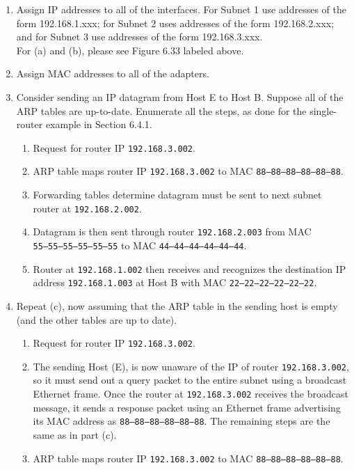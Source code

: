 \documentclass[12pt]{article}
\begin{document}
\begin{enumerate}
    \begin{enumerate}
        \item Assign IP addresses to all of the interfaces. For Subnet 1 use addresses of the form 192.168.1.xxx; for Subnet 2 uses addresses of the form 192.168.2.xxx; and for Subnet 3 use addresses of the form 192.168.3.xxx.\\[1em]
        For (a) and (b), please see Figure 6.33 labeled above.
        \item Assign MAC addresses to all of the adapters.
        \item Consider sending an IP datagram from Host E to Host B. Suppose all of the ARP tables are up-to-date. Enumerate all the steps, as done for the single-router example in Section 6.4.1.
        \begin{enumerate}
            \item Request for router IP \texttt{192.168.3.002}.
            \item ARP table maps router IP \texttt{192.168.3.002} to MAC \texttt{88--88--88--88--88--88}.
            \item Forwarding tables determine datagram must be sent to next subnet router at \texttt{192.168.2.002}.
            \item Datagram is then sent through router \texttt{192.168.2.003} from MAC\\ \texttt{55--55--55--55--55--55} to MAC \texttt{44--44--44--44--44--44}.
            \item Router at \texttt{192.168.1.002} then receives and recognizes the destination IP address \texttt{192.168.1.003} at Host B with MAC \texttt{22--22--22--22--22--22}.
        \end{enumerate}
        \item Repeat (c), now assuming that the ARP table in the sending host is empty (and the other tables are up to date).
        \begin{enumerate}
            \item Request for router IP \texttt{192.168.3.002}.
            \item The sending Host (E), is now unaware of the IP of router \texttt{192.168.3.002}, so it must send out a query packet to the entire subnet using a broadcast Ethernet frame. Once the router at \texttt{192.168.3.002} receives the broadcast message, it sends a response packet using an Ethernet frame advertising its MAC address as \texttt{88--88--88--88--88--88}. The remaining steps are the same as in part (c).
            \item ARP table maps router IP \texttt{192.168.3.002} to MAC \texttt{88--88--88--88--88--88}.

\end{enumerate}
\end{enumerate}
\end{enumerate}
\end{document}
